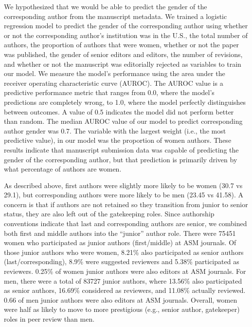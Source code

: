 \documentclass[11pt,]{article}
\begin{document}
We hypothesized that we would be able to predict the gender of the
corresponding author from the manuscript metadata. We trained a logistic
regression model to predict the gender of the corresponding author using
whether or not the corresponding author's institution was in the U.S.,
the total number of authors, the proportion of authors that were women,
whether or not the paper was published, the gender of senior editors and
editors, the number of revisions, and whether or not the manuscript was
editorially rejected as variables to train our model. We measure the
model's performance using the area under the receiver operating
characteristic curve (AUROC). The AUROC value is a predictive
performance metric that ranges from 0.0, where the model's predictions
are completely wrong, to 1.0, where the model perfectly distinguishes
between outcomes. A value of 0.5 indicates the model did not perform
better than random. The median AUROC value of our model to predict
corresponding author gender was 0.7. The variable with the largest
weight (i.e., the most predictive value), in our model was the
proportion of women authors. These results indicate that manuscript
submission data was capable of predicting the gender of the
corresponding author, but that prediction is primarily driven by what
percentage of authors are women.

As described above, first authors were slightly more likely to be women
(30.7 vs 29.1), but corresponding authors were more likely to be men
(23.45 vs 41.58). A concern is that if authors are not retained so they
transition from junior to senior status, they are also left out of the
gatekeeping roles. Since authorship conventions indicate that last and
corresponding authors are senior, we combined both first and middle
authors into the ``junior'' author role. There were 75451 women who
participated as junior authors (first/middle) at ASM journals. Of those
junior authors who were women, 8.21\% also participated as senior
authors (last/corresponding), 8.9\% were suggested reviewers and 5.38\%
participated as reviewers. 0.25\% of women junior authors were also
editors at ASM journals. For men, there were a total of 83727 junior
authors, where 13.56\% also participated as senior authors, 16.69\%
considered as reviewers, and 11.08\% actually reviewed. 0.66 of men
junior authors were also editors at ASM journals. Overall, women were
half as likely to move to more prestigious (e.g., senior author,
gatekeeper) roles in peer review than men.
\end{document}
